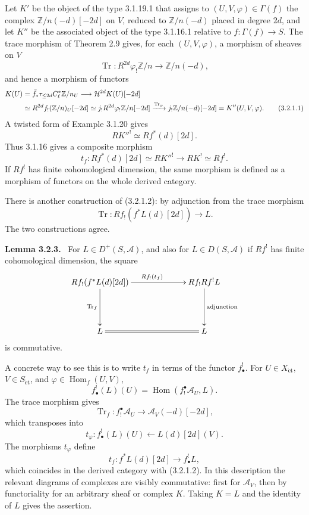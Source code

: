 \documentclass[12pt]{article}
\newcommand{\Aa}{\mathcal A}
\newcommand{\ZZ}{\mathbb Z}
\DeclareMathOperator{\Hom}{Hom}
\DeclareMathOperator{\Tr}{Tr}
\newcommand{\et}{\mathrm{\acute et}}
\newenvironment{statement}[1]{\par\medskip\noindent\textbf{#1.}\ }{\par\medskip}
\begin{document}
Let $K'$ be the object of the type 3.1.19.1 that assigns to $(U,V,\varphi)\in\Gamma(f)$ the complex $\ZZ/n(-d)[-2d]$ on $V$, reduced to $\ZZ/n(-d)$ placed in degree $2d$, and let $K''$ be the associated object of the type 3.1.16.1 relative to $f:\Gamma(f)\to S$. The trace morphism of Theorem 2.9 gives, for each $(U,V,\varphi)$, a morphism of sheaves on $V$
\[
   \Tr:R^{2d}\varphi_!\ZZ/n\longrightarrow \ZZ/n(-d),
\]
and hence a morphism of functors
\begin{align}
K(U)&=\bar f_*\tau_{\leq 2d}C_\ell^*\ZZ/n_U
     \longrightarrow \mathcal H^{2d}K(U)[-2d]                                      \notag\\
&\simeq R^{2d}f_!(\ZZ/n)_U[-2d]
  \simeq j_!R^{2d}\varphi_!\ZZ/n[-2d]
  \xrightarrow{\Tr_\varphi} j_!\ZZ/n(-d)[-2d]=K''(U,V,\varphi). \tag{3.2.1.1}
\end{align}
A twisted form of Example 3.1.20 gives
\[
   R{K''}^!\simeq Rf^*(d)[2d].
\]
Thus 3.1.16 gives a composite morphism
\begin{equation}
   t_f: Rf^*(d)[2d]\simeq R{K''}^!\longrightarrow RK^!\simeq Rf^!. \tag{3.2.1.2}
\end{equation}
If $Rf^!$ has finite cohomological dimension, the same morphism is defined as a morphism of functors on the whole derived category.

There is another construction of (3.2.1.2): by adjunction from the trace morphism
\[
   \Tr:Rf_!(f^*L(d)[2d])\longrightarrow L.
\]
The two constructions agree.

\begin{statement}{Lemma 3.2.3}
For $L\in D^+(S,\Aa)$, and also for $L\in D(S,\Aa)$ if $Rf^!$ has finite cohomological dimension, the square
\[
\xymatrix@C=2.3cm@R=1.55cm{
Rf_!(f^*L(d)[2d])\ar[d]_{\Tr_f}\ar[r]^{Rf_!(t_f)}&Rf_!Rf^!L\ar[d]^{\mathrm{adjunction}}\\
L\ar@{=}[r]&L
}
\]
is commutative.
\end{statement}

A concrete way to see this is to write $t_f$ in terms of the functor $f^!_{\bullet}$. For $U\in X_{\et}$, $V\in S_{\et}$, and $\varphi\in\Hom_f(U,V)$,
\[
   f^!_{\bullet}(L)(U)=\Hom(f_!^{\bullet}\Aa_U,L).
\]
The trace morphism gives
\[
   \Tr_f:f_!^{\bullet}\Aa_U\longrightarrow \Aa_V(-d)[-2d],
\]
which transposes into
\[
   t_\varphi:f^!_{\bullet}(L)(U)\longleftarrow L(d)[2d](V).
\]
The morphisms $t_\varphi$ define
\[
   t_f:f^*L(d)[2d]\longrightarrow f^!_{\bullet}L,
\]
which coincides in the derived category with (3.2.1.2). In this description the relevant diagrams of complexes are visibly commutative: first for $\Aa_V$, then by functoriality for an arbitrary sheaf or complex $K$. Taking $K=L$ and the identity of $L$ gives the assertion.
\end{document}
